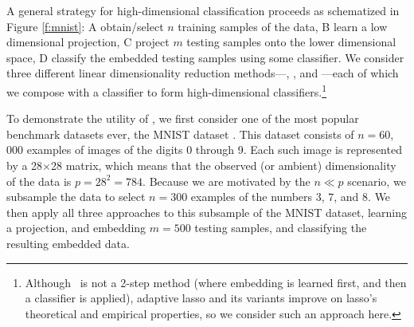 \documentclass[10pt]{article}
\begin{document}
A general strategy for high-dimensional classification proceeds as  schematized in Figure \ref{f:mnist}:
A obtain/select $n$ training samples of the data,
B learn a low dimensional projection,
C project $m$ testing samples onto the lower dimensional space,
D classify the embedded testing samples using some classifier.
We consider  three different linear dimensionality reduction methods---, \Pca, and \Lol---each of which we compose with a classifier to form high-dimensional classifiers.\footnote{Although ~is not a 2-step method (where embedding is learned first, and then a classifier is applied), adaptive lasso \cite{Zou2006a} and its variants improve on lasso's theoretical and empirical properties, so we consider such an approach here.}

To demonstrate the utility of \Lol, we  first consider one of the most popular benchmark datasets ever, the MNIST dataset \cite{mnist}.  This dataset consists of $n=60$,$000$ examples of images of the digits 0 through 9.  Each such image is represented by a 28$\times$28 matrix, which means that the observed (or ambient) dimensionality of the data is $p=28^2=784$.  Because we are motivated by the $n \ll p$ scenario, we subsample the data to select $n=300$ examples of the numbers $3$, $7$, and $8$. We then apply all three approaches to this subsample of the MNIST dataset, learning a projection, and embedding $m=500$ testing samples, and classifying the resulting embedded data.

\end{document}
